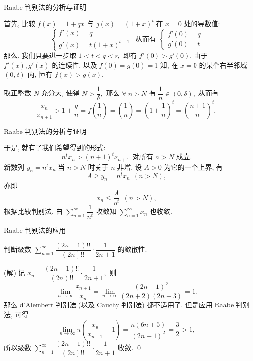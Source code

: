 \begin{frame}{Raabe 判别法的分析与证明}

首先, 比较 $f(x) = 1 + qx$ 与 $g(x) = (1 + x)^t$ 在 $x = 0$ 处的导数值:
\[
\begin{cases}
f'(x) = q \\
g'(x) = t(1+x)^{t-1}
\end{cases} ~~ \text{从而有} ~~
\begin{cases}
f'(0) = q \\
g'(0) = t
\end{cases}
\]
\pause
那么, 我们只要进一步取 $1 < t < q < r,$ 即有 $f'(0) > g'(0).$ 由于 $f'(x), g'(x)$ 的连续性, 以及 $f(0) = g(0) = 1$ 知, 在 $x = 0$ 的某个右半邻域 $(0, \delta)$ 内, 恒有 $f(x) > g(x).$

\pause

取正整数 $N$ 充分大, 使得 $N > \dfrac{1}{\delta},$ 那么 $\forall~n > N$ 有 $\dfrac{1}{n} \in (0, \delta),$ 从而有
\[\dfrac{x_n}{x_{n+1}} > 1 + \dfrac{q}{n} = f \left(\dfrac{1}{n}\right) = \left(\dfrac{1}{n}\right) = \left( 1 + \dfrac{1}{n} \right)^t = \left( \dfrac{n+1}{n} \right)^t,\]

\end{frame}


\begin{frame}{Raabe 判别法的分析与证明}

于是, 就有了我们希望得到的形式:
\[n^t x_n > (n+1)^t x_{n+1} ~~ \text{对所有 $n > N$ 成立.}\]
新数列 $y_n = n^t x_n$ 当 $n > N$ 时关于 $n$ 非增, 设 $A > 0$ 为它的一个上界, 有
\[A \geqslant y_n = n^t x_n ~~ (n > N),\]
亦即
\[x_n \leqslant \dfrac{A}{n^t} ~~ (n > N),\]
根据比较判别法, 由 $\sum\limits_{n=1}^\infty \dfrac{1}{n^t}$ 收敛知 $\sum\limits_{n=1}^\infty x_n$ 也收敛.

\end{frame}


\begin{frame}{Raabe 判别法的应用}

\begin{eg}
\begin{center}
判断级数 $\sum\limits_{n=1}^\infty \dfrac{(2n-1)!!}{(2n)!!} \cdot \dfrac{1}{2n+1}$ 的敛散性.
\end{center}
\end{eg}

\pause

\startproof[bg=yellow, fg=red](解)
记 $x_n = \dfrac{(2n-1)!!}{(2n)!!} \cdot \dfrac{1}{2n+1},$ 则
\[\lim\limits_{n\to\infty} \dfrac{x_{n+1}}{x_n} = \lim\limits_{n\to\infty} \dfrac{(2n+1)^2}{(2n+2)(2n+3)} = 1.\]
那么 d'Alembert 判别法 (以及 Cauchy 判别法) 都不适用了.
\pause
但是应用 Raabe 判别法, 可得
\[\lim\limits_{n\to\infty} n \left( \dfrac{x_n}{x_{n+1}} - 1 \right) = \dfrac{n(6n+5)}{(2n+1)^2} = \dfrac{3}{2} > 1,\]
所以级数 $\sum\limits_{n=1}^\infty \dfrac{(2n-1)!!}{(2n)!!} \cdot \dfrac{1}{2n+1}$ 收敛.
\qed

\end{frame}

